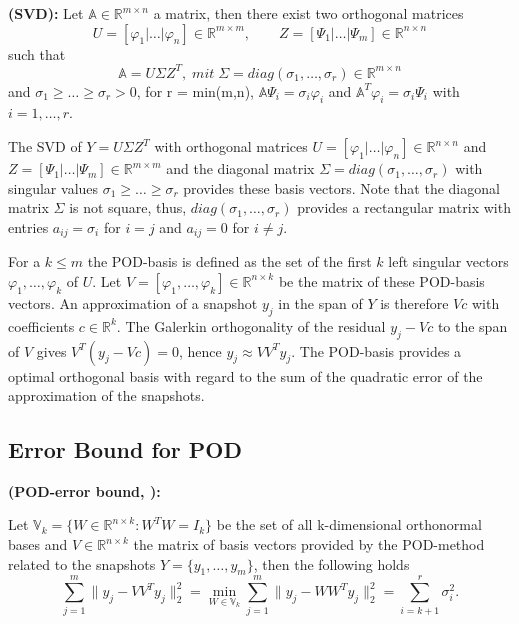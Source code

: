 \begin{mydef} \textbf{(SVD):}
Let $\mathbb{A} \in \mathbb{R}^{m \times n}$ a matrix, then there exist two orthogonal matrices  
\begin{equation*}
 U=[\varphi_1 | \dots | \varphi_n] \in \mathbb{R}^{m \times m}, \qquad Z=[\varPsi_1|\dots|\varPsi_m] \in \mathbb{R}^{n \times n}
\end{equation*}
such that
\begin{equation}
 \mathbb{A} = U\Sigma Z^T, \; mit \; \Sigma = diag(\sigma_1,\dots,\sigma_r) \in \mathbb{R}^{m \times n}
\end{equation}
and $\sigma_1 \geq \dots \geq \sigma_r > 0$, for r = min(m,n), $\mathbb{A}\varPsi_i = \sigma_i \varphi_i$ and $\mathbb{A}^T \varphi_i = \sigma_i \varPsi_i$ with $i=1,\dots,r$.
\end{mydef}

The SVD of $Y = U\Sigma Z^T $
with orthogonal matrices $U=[\varphi_1 | \dots | \varphi_n] \in \mathbb{R}^{n \times n}$ and
$Z=[\varPsi_1|\dots|\varPsi_m] \in \mathbb{R}^{m \times m}$ and the diagonal matrix 
$\Sigma = diag(\sigma_1, \dots ,\sigma_r)$ with singular values $\sigma_1 \geq \dots \geq \sigma_r$
provides these  basis vectors. Note that the diagonal matrix $\Sigma$ is not square, thus, $diag(\sigma_1,\dots,\sigma_r)$ provides 
a rectangular matrix with entries $a_{ij} = \sigma_i$ for $i=j$ and $a_{ij} = 0$ for $i \neq j$. 

For a $k \leq m$ the POD-basis is defined as the set of the first $k$ left singular vectors $\varphi_1,\dots,\varphi_k$
of $U$. Let $V = [\varphi_1,\dots,\varphi_k] \in \mathbb{R}^{n \times k}$ be the matrix of these POD-basis vectors.
An approximation of a snapshot $y_j$ in the span of $Y$ is therefore $Vc$
with coefficients $c \in \mathbb{R}^k$. The Galerkin orthogonality of the residual $y_j - Vc$ 
to the span of $V$ gives $V^T(y_j - Vc) = 0$, hence $y_j \approx VV^Ty_j$. 
The POD-basis provides a optimal orthogonal basis with regard to 
the sum of the quadratic error of the approximation of the snapshots.

\newpage

\subsection{Error Bound for POD}
\begin{mytheo} \textbf{(POD-error bound, \cite[p.~125]{ROM_book2}):}

Let $\mathbb{V}_k = \{ W \in \mathbb{R}^{n \times k} : W^TW = I_k\} $ be the set of all k-dimensional orthonormal bases 
and $V \in \mathbb{R}^{n \times k}$  the matrix of basis vectors provided by the POD-method related to 
the snapshots $Y = \{y_1,\dots,y_m\}$, then the following holds
\begin{equation}\label{ch2:error_bound_pod}
 \sum_{j=1}^m\parallel y_j - VV^Ty_j\parallel_2^2 =\min_{W \in \mathbb{V}_k} 
 \sum_{j=1}^m\parallel y_j - WW^Ty_j\parallel_2^2 = \sum_{i=k+1}^r \sigma^2_i.
\end{equation}
\end{mytheo}

